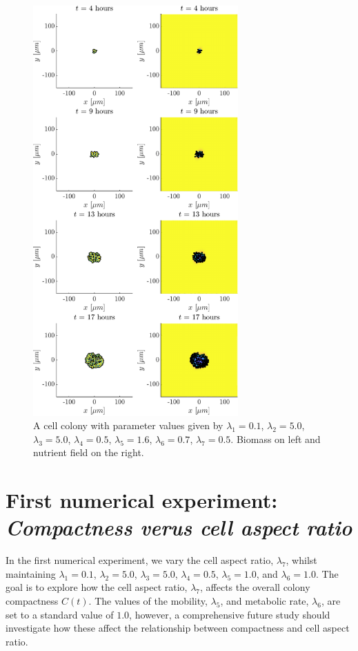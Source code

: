 \begin{figure}[!htb]
    \centering
    \includegraphics[width= 0.7\textwidth]{
        chapter3/figures/t_all_L1_0o10_L2_5o00_L3_5o00_L4_0o50_L5_1o60_L6_0o70_L7_0o50.pdf}
    \caption{A cell colony with parameter values given by
             $\lambda_1 = 0.1$,  
             $\lambda_2 = 5.0$, 
             $\lambda_3 = 5.0$, 
             $\lambda_4 = 0.5$, 
             $\lambda_5 = 1.6$, 
             $\lambda_6 = 0.7$, 
             $\lambda_7 = 0.5$. 
             Biomass on left and nutrient field on the right.}
    \label{fig:colony5}
\end{figure}


\section{First numerical experiment: \\ \textit{Compactness verus cell aspect ratio}}\label{sec:numExp1}
In the first numerical experiment, we vary the cell aspect ratio, $\lambda_7$,
whilst maintaining $\lambda_1 = 0.1$, $\lambda_2 = 5.0$, $\lambda_3 = 5.0$, $\lambda_4 = 0.5$, $\lambda_5 = 1.0$, 
and $\lambda_6 = 1.0$. The goal is to explore how the cell aspect ratio, $\lambda_7$, affects the overall 
colony compactness $C(t)$. The values of the mobility, $\lambda_5$, and metabolic rate, $\lambda_6$, are set to a standard 
value of $1.0$, however, a comprehensive future study should investigate how these affect the relationship
between compactness and cell aspect ratio.
\\

